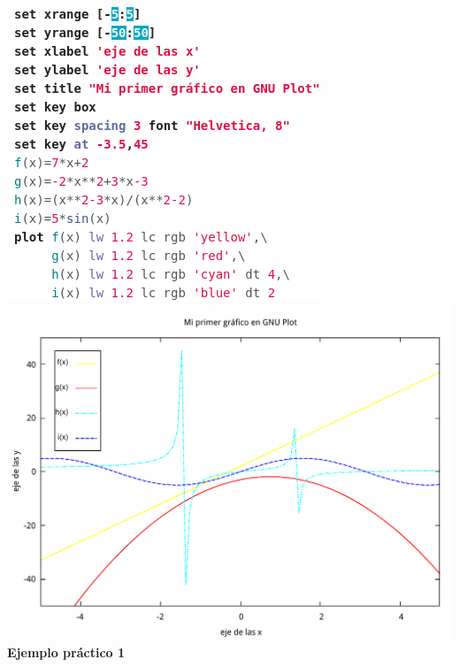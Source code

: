 \documentclass[11.5pt,a4paper]{article}
\begin{document}
\includegraphics[scale=0.50]{screen2.png}  
\includegraphics[scale=0.40]{ejemplo3.pdf}\\ 

\textbf{Ejemplo práctico 1}\\
\end{document}
